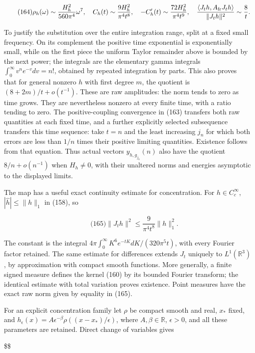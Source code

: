 \[
\qquad\text{(164)}
 \rho_h(\omega)\sim\frac{H_h^2}{560\pi^4}\omega^7,
 \quad C_h(t)\sim\frac{9H_h^2}{\pi^4t^8},\quad
 -C_h'(t)\sim\frac{72H_h^2}{\pi^4t^9},\quad
 \frac{\langle J_th,A_{\rm fr}J_th\rangle}{\|J_th\|^2}
       \sim\frac8t.
\]

To justify the substitution over the entire integration range, split at
a fixed small frequency. On its complement the positive time exponential
is exponentially small, while on the first piece the uniform Taylor
remainder above is bounded by the next power; the integrals are the
elementary gamma integrals \(\int_0^\infty v^n e^{-v}dv=n!\), obtained
by repeated integration by parts. This also proves that for general
nonzero \(h\) with first degree \(m\), the quotient is
\((8+2m)/t+o(t^{-1})\). These are raw amplitudes: the norm tends to zero
as time grows. They are nevertheless nonzero at every finite time, with
a ratio tending to zero. The positive-coupling convergence in (163)
transfers both raw quantities at each fixed time, and a further
explicitly selected subsequence transfers this time sequence: take
\(t=n\) and the least increasing \(j_n\) for which both errors are less
than \(1/n\) times their positive limiting quantities. Existence follows
from that equation. Thus actual vectors \(y_{h,g_{j_n}}(n)\) also have
the quotient \(8/n+o(n^{-1})\) when \(H_h\ne0\), with their unaltered
norms and energies asymptotic to the displayed limits.

The map has a useful exact continuity estimate for concentration. For
\(h\in C_c^\infty\), \(|\widehat h|\le\|h\|_1\) in (158), so

\[
\qquad\text{(165)}
 \|J_t h\|^2\le \frac{9}{\pi^4t^8}\|h\|_1^2.
\]

The constant is the integral
\(4\pi\int_0^\infty K^6e^{-tK}dK/(320\pi^5t)\), with every Fourier
factor retained. The same estimate for differences extends \(J_t\)
uniquely to \(L^1(\mathbb R^3)\), by approximation with compact smooth
functions. More generally, a finite signed measure defines the kernel
(160) by its bounded Fourier transform; the identical estimate with
total variation proves existence. Point measures have the exact raw norm
given by equality in (165).

For an explicit concentration family let \(\rho\) be compact smooth and
real, \(x_*\) fixed, and
\(h_\epsilon(x)=A\epsilon^{-\beta}\rho((x-x_*)/\epsilon)\), where
\(A,\beta\in\mathbb R\), \(\epsilon>0\), and all these parameters are
retained. Direct change of variables gives

\$\$

